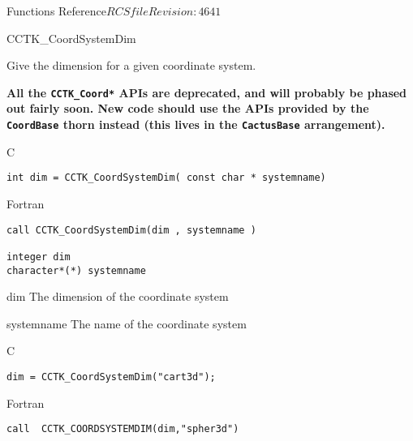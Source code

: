 \begin{cactuspart}{ Functions Reference}{$RCSfile$}{$Revision: 4641 $}

\begin{FunctionDescription}{CCTK\_CoordSystemDim}%
{Give the dimension for a given coordinate system.

\textbf{All the \texttt{CCTK\_Coord*} APIs are deprecated,
and will probably be phased out fairly soon.
New code should use the APIs provided by the \texttt{CoordBase} thorn
instead (this lives in the \texttt{CactusBase} arrangement).}
}
\label{CCTK-CoordDim}
\begin{SynopsisSection}
\begin{Synopsis}{C}
\begin{verbatim}int dim = CCTK_CoordSystemDim( const char * systemname)\end{verbatim}
\end{Synopsis}
\begin{Synopsis}{Fortran}
\begin{verbatim}call CCTK_CoordSystemDim(dim , systemname )

integer dim
character*(*) systemname \end{verbatim}
\end{Synopsis}
\end{SynopsisSection}
\begin{ParameterSection}
\begin{Parameter}{dim}
The dimension of the coordinate system
\end{Parameter}
\begin{Parameter}{systemname}
The name of the coordinate system
\end{Parameter}
\end{ParameterSection}

\begin{ExampleSection}
\begin{Example}{C}
\begin{verbatim}
dim = CCTK_CoordSystemDim("cart3d");
\end{verbatim}
\end{Example}
\begin{Example}{Fortran}
\begin{verbatim}
call  CCTK_COORDSYSTEMDIM(dim,"spher3d")
\end{verbatim}
\end{Example}
\end{ExampleSection}
\end{FunctionDescription}



\end{cactuspart}
